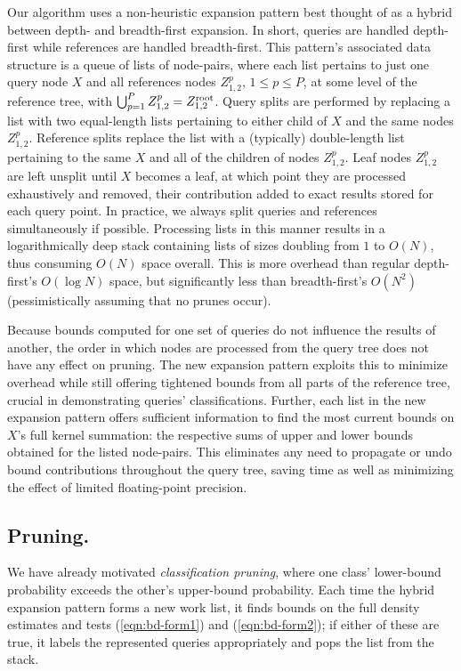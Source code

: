 \documentclass[twoside,leqno,twocolumn]{article}
\newcommand{\kdroot}[1]{#1^{\rm root}}
\begin{document}
Our algorithm uses a non-heuristic expansion pattern best thought of
as a hybrid between depth- and breadth-first expansion.  In short,
queries are handled depth-first while references are handled
breadth-first.  This pattern's associated data structure is a queue of
lists of node-pairs, where each list pertains to just one query node
$X$ and all references nodes $Z_{1,2}^p$, $1 \leq p \leq P$, at some
level of the reference tree, with $\bigcup_{p=1}^P Z_{1,2}^p =
\kdroot{Z_{1,2}}$.  Query splits are performed by replacing a list
with two equal-length lists pertaining to either child of $X$ and the
same nodes $Z_{1,2}^p$.  Reference splits replace the list with a
(typically) double-length list pertaining to the same $X$ and all of
the children of nodes $Z_{1,2}^p$.  Leaf nodes $Z_{1,2}^p$ are left
unsplit until $X$ becomes a leaf, at which point they are processed
exhaustively and removed, their contribution added to exact results
stored for each query point.  In practice, we always split queries and
references simultaneously if possible.  Processing lists in this
manner results in a logarithmically deep stack containing lists of
sizes doubling from $1$ to $O(N)$, thus consuming $O(N)$ space
overall.  This is more overhead than regular depth-first's $O(\log N)$
space, but significantly less than breadth-first's $O(N^2)$
(pessimistically assuming that no prunes occur).

Because bounds computed for one set of queries do not influence the
results of another, the order in which nodes are processed from the
query tree does not have any effect on pruning.  The new expansion
pattern exploits this to minimize overhead while still offering
tightened bounds from all parts of the reference tree, crucial in
demonstrating queries' classifications.  Further, each list in the new
expansion pattern offers sufficient information to find the most
current bounds on $X$'s full kernel summation: the respective sums of
upper and lower bounds obtained for the listed node-pairs.  This
eliminates any need to propagate or undo bound contributions
throughout the query tree, saving time as well as minimizing the
effect of limited floating-point precision.

\subsection{Pruning.}
We have already motivated {\em classification pruning}, where one
class' lower-bound probability exceeds the other's upper-bound
probability.  Each time the hybrid expansion pattern forms a new work
list, it finds bounds on the full density estimates and tests
(\ref{eqn:bd-form1}) and (\ref{eqn:bd-form2}); if either of these are
true, it labels the represented queries appropriately and pops the
list from the stack.
\end{document}
